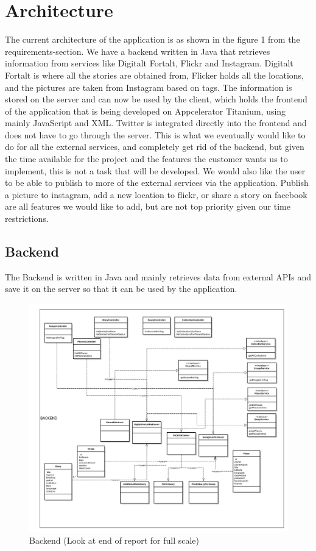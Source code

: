\section{Architecture}

The current architecture of the application is as shown in the figure 1 from the requirements-section. We have a backend written in Java that retrieves information from services like Digitalt Fortalt, Flickr and Instagram. Digitalt Fortalt is where all the stories are obtained from, Flicker holds all the locations, and the pictures are taken from Instagram based on tags. The information is stored on the server and can now be used by the client, which holds the frontend of the application that is being developed on Appcelerator Titanium, using mainly JavaScript and XML. Twitter is integrated directly into the frontend and does not have to go through the server. This is what we eventually would like to do for all the external services, and completely get rid of the backend, but given the time available for the project and the features the customer wants us to implement, this is not a task that will be developed. We would also like the user to be able to publish to more of the external services via the application. Publish a picture to instagram, add a new location to flickr, or share a story on facebook are all features we would like to add, but are not top priority given our time restrictions.

\subsection{Backend}
The Backend is written in Java and mainly retrieves data from external APIs and save it on the server so that it can be used by the application.

\begin{figure}[!h]
\begin{center}
\includegraphics[scale=0.1]{class-backend.jpg}
\caption{Backend (Look at end of report for full scale) }
\end{center}
\end{figure}

